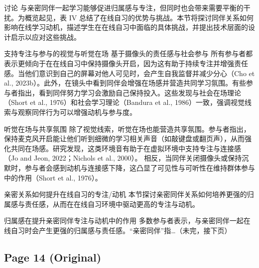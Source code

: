 \documentclass[12pt]{ctexart}
\begin{document}
讨论
与亲密同伴一起学习能够促进归属感与专注，但同时也会带来需要平衡的干扰。为概览起见，表 IV 总结了在线自习的优势与挑战。本节将探讨同伴关系如何影响在线学习动机，描述学生在在线自习中面临的具体挑战，并提出技术层面的设计启示以应对这些挑战。

支持专注与参与的视觉与听觉在场
基于摄像头的责任感与社会参与
所有参与者都表示更倾向于在在线自习中保持摄像头开启，因为这有助于持续专注并增强责任感。当他们意识到自己的屏幕对他人可见时，会产生自我监督并减少分心（Cho et al., 2023b）。此外，在镜头中看到同伴会增强在场感并营造共同学习氛围。有些参与者指出，看到同伴努力学习会激励自己保持投入。这些发现与社会在场理论（Short et al., 1976）和社会学习理论（Bandura et al., 1986）一致，强调视觉线索与观察同伴行为可以增强动机与参与度。

听觉在场与共享氛围
除了视觉线索，听觉在场也能营造共享氛围。参与者指出，保持麦克风开启能让他们听到细微的学习相关声音（如敲键盘或翻页声），从而强化共同在场感。研究发现，这类环境音有助于在虚拟环境中支持专注与连接感（Jo and Jeon, 2022；Nichols et al., 2000）。
相反，当同伴关闭摄像头或保持沉默时，参与者会感到动机与连接感下降，这凸显了可见性与可听性在维持群体参与中的作用（Short et al., 1976）。

亲密关系如何提升在线自习的专注/动机
本节探讨亲密同伴关系如何培养更强的归属感与责任感，从而在在线自习环境中驱动更高的专注与动机。

归属感在提升亲密同伴专注与动机中的作用
多数参与者表示，与亲密同伴一起在线自习时会产生更强的归属感与责任感。“亲密同伴”指…（未完，接下页）


\subsection*{Page 14 (Original)}
\end{document}
